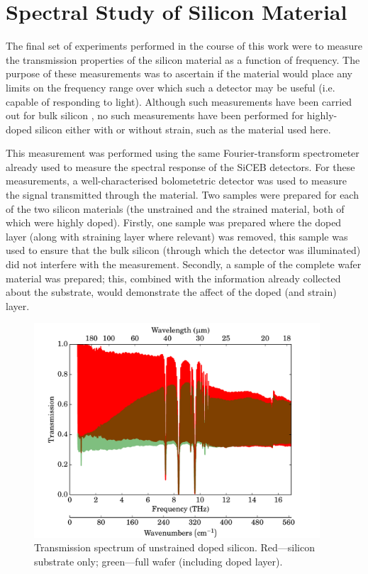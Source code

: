\section{Spectral Study of Silicon Material}\label{sec:siliconFTS}
The final set of experiments performed in the course of this work were to measure the transmission properties of the silicon material as a function of frequency. The purpose of these measurements was to ascertain if the material would place any limits on the frequency range over which such a detector may be useful (i.e. capable of responding to light). Although such measurements have been carried out for bulk silicon \parencite[see for example][]{Hawkins1998}, no such measurements have been performed for highly-doped silicon  either with or without strain, such as the material used here.
\par 
This measurement was performed using the same Fourier-transform spectrometer already used to measure the spectral response of the SiCEB detectors. For these measurements, a well-characterised bolometetric  detector was used to measure the signal transmitted through the material. Two samples were prepared for each of the two silicon materials (the unstrained and the strained material, both of which were highly doped). Firstly, one sample was prepared where the doped layer (along with straining layer where relevant) was removed, this sample was used to ensure that the bulk silicon (through which the detector was illuminated) did not interfere with the measurement. Secondly, a sample of the complete wafer material was prepared; this, combined with the information already collected about the substrate, would demonstrate the affect of the doped (and strain) layer.
\begin{figure}[tb]
\begin{center}
\includegraphics[width = 0.95\textwidth]{figures/control_materialFTS}
\caption[Transmission spectrum of unstrained doped silicon]{Transmission spectrum of unstrained doped silicon. Red---silicon substrate only; green---full wafer (including doped layer).}
\label{fig:control_materialFTS}
\end{center}
\end{figure}
